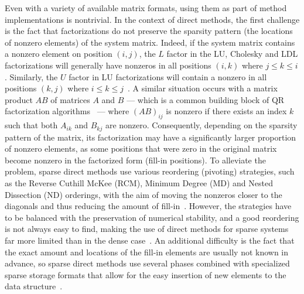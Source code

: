 Even with a variety of available matrix formats, using them as part of method
implementations is nontrivial. In the context of direct methods, the first
challenge is the fact that factorizations do not preserve the sparsity pattern
(\ie the locations of nonzero elements) of the system matrix. Indeed, if the
system matrix contains a nonzero element on position $(i, j)$, the $L$
factor in the LU, Cholesky and LDL factorizations will generally have nonzeros
in all positions $(i, k)$ where $j \leq k \leq i$. Similarly, the $U$ factor in
LU factorizations will contain a nonzero in all positions $(k, j)$ where $i
\leq k \leq j$~\cite{duff}. A similar situation occurs with a matrix product
$AB$ of matrices $A$ and $B$ --- which is a common building block of QR
factorization algorithms~\cite{demmel} --- where $(AB)_{ij}$ is nonzero if there
exists an index $k$ such that both $A_{ik}$ and $B_{kj}$ are nonzero.
Consequently, depending on the sparsity pattern of the matrix, its
factorization may have a significantly larger proportion of nonzero elements, as
some positions that were zero in the original matrix become nonzero in the
factorized form (fill-in positions). To alleviate the problem, sparse direct
methods use various reordering (pivoting) strategies, such as the Reverse
Cuthill McKee (RCM), Minimum Degree (MD) and Nested Dissection (ND) orderings,
with the aim of moving the nonzeros closer to the diagonals and thus reducing
the amount of fill-in~\cite{saad, duff}. However, the strategies have to be
balanced with the preservation of numerical stability, and a good reordering is
not always easy to find, making the use of direct methods for sparse systems far
more limited than in the dense case~\cite{saad, duff}. An additional difficulty
is the fact that the exact amount and locations of the fill-in elements are
usually not known in advance, so sparse direct methods use several phases
combined with specialized sparse storage formats that allow for the easy
insertion of new elements to the data structure~\cite{saad, duff}.

